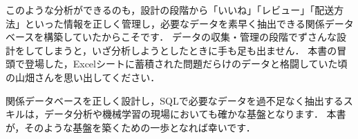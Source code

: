 このような分析ができるのも，設計の段階から「いいね」「レビュー」「配送方法」といった情報を正しく管理し，必要なデータを素早く抽出できる関係データベースを構築していたからこそです．
データの収集・管理の段階でずさんな設計をしてしまうと，いざ分析しようとしたときに手も足も出ません．
本書の冒頭で登場した，Excelシートに蓄積された問題だらけのデータと格闘していた頃の山畑さんを思い出してください．

関係データベースを正しく設計し，SQLで必要なデータを過不足なく抽出するスキルは，データ分析や機械学習の現場においても確かな基盤となります．
本書が，そのような基盤を築くための一歩となれば幸いです．




